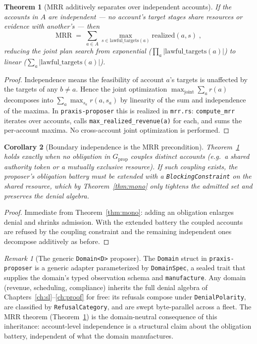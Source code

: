 \documentclass[11pt,oneside]{book}
\theoremstyle{definition}
\theoremstyle{plain}
\newtheorem{theorem}{Theorem}[chapter]
\newtheorem{corollary}[theorem]{Corollary}
\theoremstyle{remark}
\newtheorem*{remark}{Remark}
\newcommand{\code}[1]{\texttt{#1}}
\begin{document}
\begin{theorem}[MRR additively separates over independent accounts]\label{thm:mrrsep}
If the accounts in $A$ are independent --- no account's target stages share resources or evidence with another's --- then
\[
\mathrm{MRR}\;=\;\sum_{a\in A}\max_{s\in\mathrm{lawful\_targets}(a)}\mathrm{realized}(a,s)\;,
\]
reducing the joint plan search from exponential ($\prod_{a}|\mathrm{lawful\_targets}(a)|$) to linear ($\sum_{a}|\mathrm{lawful\_targets}(a)|$). %
\end{theorem}

\begin{proof}
Independence means the feasibility of account $a$'s targets is unaffected by the targets of any $b\neq a$. %
Hence the joint optimization $\max_{\text{joint}}\sum_a r(a)$ decomposes into $\sum_a\max_{s_a} r(a, s_a)$ by linearity of the sum and independence of the maxima. %
In \code{praxis-proposer} this is realized in \code{mrr.rs}: \code{compute\_mrr} iterates over accounts, calls \code{max\_realized\_revenue(a)} for each, and sums the per-account maxima. %
No cross-account joint optimization is performed. %
\end{proof}

\begin{corollary}[Boundary independence is the MRR precondition]\label{cor:mrrindep}
Theorem~\ref{thm:mrrsep} holds exactly when no obligation in $G_{\mathrm{prop}}$ couples distinct accounts (e.g.\ a shared authority token or a mutually exclusive resource). %
If such coupling exists, the proposer's obligation battery must be extended with a \code{BlockingConstraint} on the shared resource, which by Theorem~\ref{thm:mono} only tightens the admitted set and preserves the denial algebra. %
\end{corollary}

\begin{proof}
Immediate from Theorem~\ref{thm:mono}: adding an obligation enlarges denial and shrinks admission. %
With the extended battery the coupled accounts are refused by the coupling constraint and the remaining independent ones decompose additively as before. %
\end{proof}

\begin{remark}[The generic \code{Domain<D>} proposer]
The \code{Domain} struct in \code{praxis-proposer} is a generic adapter parameterized by \code{DomainSpec}, a sealed trait that supplies the domain's typed observation schema and \code{manufacture}. %
Any domain (revenue, scheduling, compliance) inherits the full denial algebra of Chapters~\ref{ch:sl}--\ref{ch:proof} for free: its refusals compose under \code{DenialPolarity}, are classified by \code{RefusalCategory}, and are swept byte-parallel across a fleet. %
The MRR theorem (Theorem~\ref{thm:mrrsep}) is the domain-neutral consequence of this inheritance: account-level independence is a structural claim about the obligation battery, independent of what the domain manufactures. %
\end{remark}
\end{document}
